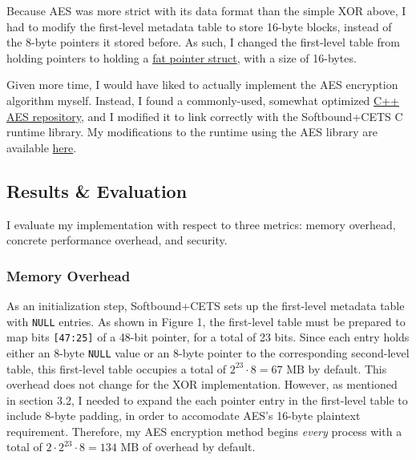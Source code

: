 \documentclass{article}
\begin{document}
        \bigbreak{}

        Because AES was more strict with its data format than the simple XOR above, I had to modify
        the first-level metadata table to store 16-byte blocks, instead of the 8-byte
        pointers it stored before. As such, I changed the first-level
        table from holding pointers to holding a \href{https://github.com/parthsarkar17/softboundcets-ese5370/blob/9f1638e82fdab76a96012aed4c80b0a509b79c52/llvm-project/compiler-rt/lib/softboundcets/softboundcets.h#L109}{fat pointer struct},
        with a size of 16-bytes.
        
        \bigbreak{}

        Given more time, I would have liked to actually implement the AES
        encryption algorithm myself. Instead, I found a commonly-used, somewhat
        optimized \href{https://github.com/SergeyBel/AES}{C++ AES repository}, 
        and I modified it to link correctly with the Softbound+CETS C runtime 
        library. My modifications to the runtime using the AES library are 
        available \href{https://github.com/parthsarkar17/softboundcets-ese5370/blob/9f1638e82fdab76a96012aed4c80b0a509b79c52/llvm-project/compiler-rt/lib/softboundcets/softboundcets.cpp#L125}{here}.
        

    \subsection{Results \& Evaluation}

        I evaluate my implementation with respect to three metrics: memory
        overhead, concrete performance overhead, and security.

        \subsubsection{Memory Overhead}

            As an initialization step, Softbound+CETS sets up the first-level
            metadata table with \verb|NULL| entries. As shown in Figure 1,
            the first-level table must be prepared to map bits \verb|[47:25]|
            of a 48-bit pointer, for a total of 23 bits. Since each entry
            holds either an 8-byte \verb|NULL| value or an 8-byte pointer to the 
            corresponding second-level table, this first-level table occupies
            a total of $2^{23} \cdot 8 = 67\text{ MB}$ by default. This overhead
            does not change for the XOR implementation. However, as mentioned in
            section 3.2, I needed to expand the each pointer entry in the
            first-level table to include 8-byte padding, in order to accomodate
            AES's 16-byte plaintext requirement. Therefore, my AES encryption
            method begins \textit{every} process with a total of 
            $2 \cdot 2^{23} \cdot 8 = 134\text{ MB}$ of overhead by default.
\end{document}
